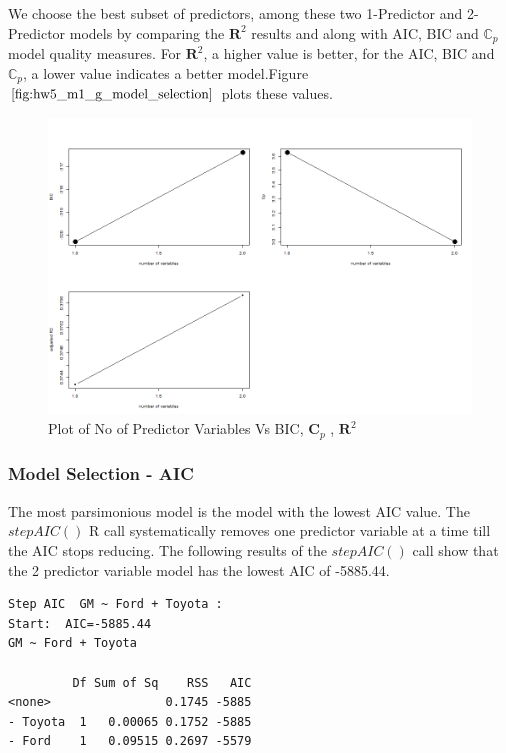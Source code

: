 \documentclass[twoside,12pt]{article}
\begin{document}
{
We choose the best subset of predictors, among these two 1-Predictor and 2-Predictor models by comparing the $\mathbf{R}^2$ results and along with AIC, BIC and $\mathbb{C}_p$ model quality measures. For  $\mathbf{R}^2$, a higher value is better, for the AIC, BIC and $\mathbb{C}_p$, a lower value indicates a better model.Figure $\eqref{fig:hw5_m1_g_model_selection}$ plots these values.
\begin{figure}[htbp!]
     \begin{center}
             \hspace*{-0.9in}
            \includegraphics[width=1.35\textwidth]{charts/hw5_m1_g_complexity}
    \end{center}
    \caption{%
    Plot of No of Predictor Variables Vs BIC, $\mathbf{C}_p$ , $\mathbf{R}^2$ 
     }%
   \label{fig:hw5_m1_g_model_selection}
\end{figure}
}

\subsubsection{Model Selection - AIC}
\label{stepaic_1}
The most parsimonious model is the model with the lowest AIC value. The $stepAIC()$ R call systematically removes one predictor variable at a time till the AIC stops reducing. The following results of the $stepAIC()$ call show that the 2 predictor variable model has the lowest AIC of -5885.44.
\begin{verbatim}
Step AIC  GM ~ Ford + Toyota :
Start:  AIC=-5885.44
GM ~ Ford + Toyota

         Df Sum of Sq    RSS   AIC
<none>                0.1745 -5885
- Toyota  1   0.00065 0.1752 -5885
- Ford    1   0.09515 0.2697 -5579

\end{verbatim}
\end{document}

